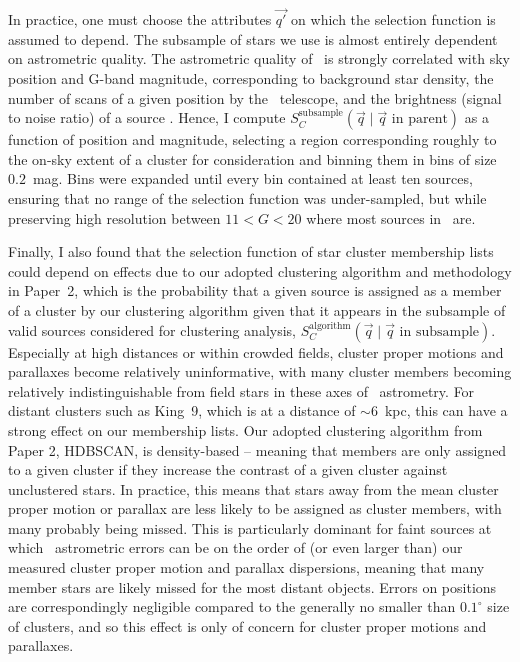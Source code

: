 In practice, one must choose the attributes $\vec{q'}$ on which the selection function is assumed to depend. The subsample of stars we use is almost entirely dependent on astrometric quality. The astrometric quality of \gaia\ is strongly correlated with sky position and G-band magnitude, corresponding to background star density, the number of scans of a given position by the \gaia\ telescope, and the brightness (signal to noise ratio) of a source \citep{lindegren_gaia_2021}. Hence, I compute $S_C^\text{subsample}(\vec{q} \mid \vec{q}\text{ in parent})$ as a function of position and magnitude, selecting a region corresponding roughly to the on-sky extent of a cluster for consideration and binning them in bins of size $0.2$~mag. Bins were expanded until every bin contained at least ten sources, ensuring that no range of the selection function was under-sampled, but while preserving high resolution between $11 < G < 20$ where most sources in \gaia\ are.

Finally, I also found that the selection function of star cluster membership lists could depend on effects due to our adopted clustering algorithm and methodology in Paper~2, which is the probability that a given source is assigned as a member of a cluster by our clustering algorithm given that it appears in the subsample of valid sources considered for clustering analysis, $S_C^\text{algorithm}(\vec{q} \mid \vec{q}\text{ in subsample})$. Especially at high distances or within crowded fields, cluster proper motions and parallaxes become relatively uninformative, with many cluster members becoming relatively indistinguishable from field stars in these axes of \gaia\ astrometry. For distant clusters such as King~9, which is at a distance of $\sim6$~kpc, this can have a strong effect on our membership lists. Our adopted clustering algorithm from Paper 2, HDBSCAN, is density-based -- meaning that members are only assigned to a given cluster if they increase the contrast of a given cluster against unclustered stars. In practice, this means that stars away from the mean cluster proper motion or parallax are less likely to be assigned as cluster members, with many probably being missed. This is particularly dominant for faint sources at which \gaia\ astrometric errors can be on the order of (or even larger than) our measured cluster proper motion and parallax dispersions, meaning that many member stars are likely missed for the most distant objects. Errors on positions are correspondingly negligible compared to the generally no smaller than $0.1^\circ$ size of clusters, and so this effect is only of concern for cluster proper motions and parallaxes.

